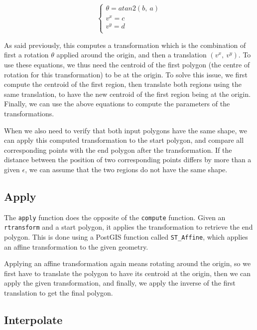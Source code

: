 \[
    \begin{cases}
        \theta = atan2(b,\ a) \\
        v^x = c \\
        v^y = d \\
    \end{cases}
\]

As said previously, this computes a transformation which is the combination of first a rotation $\theta$ applied around the origin, and then a translation $(v^x,\ v^y)$. To use these equations, we thus need the centroid of the first polygon (the centre of rotation for this transformation) to be at the origin. To solve this issue, we first compute the centroid of the first region, then translate both regions using the same translation, to have the new centroid of the first region being at the origin. Finally, we can use the above equations to compute the parameters of the transformations.

When we also need to verify that both input polygons have the same shape, we can apply this computed transformation to the start polygon, and compare all corresponding points with the end polygon after the transformation. If the distance between the position of two corresponding points differs by more than a given $\epsilon$, we can assume that the two regions do not have the same shape.

\subsection{Apply}
\label{section:apply}

The \lstinline{apply} function does the opposite of the \lstinline{compute} function. Given an \lstinline{rtransform} and a start polygon, it applies the transformation to retrieve the end polygon. This is done using a PostGIS function called \lstinline{ST_Affine}, which applies an affine transformation to the given geometry. 

Applying an affine transformation again means rotating around the origin, so we first have to translate the polygon to have its centroid at the origin, then we can apply the given transformation, and finally, we apply the inverse of the first translation to get the final polygon.

\subsection{Interpolate}
\label{section:interpolate}


